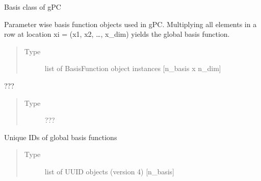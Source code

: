 \documentclass[letterpaper,10pt,english,openany,oneside]{sphinxmanual}
\begin{document}
\begin{fulllineitems}
\label{\detokenize{pygpc:pygpc.Basis.Basis}}
Basis class of gPC

\begin{fulllineitems}
\label{\detokenize{pygpc:pygpc.Basis.Basis.b}}
Parameter wise basis function objects used in gPC.
Multiplying all elements in a row at location xi = (x1, x2, …, x\_dim) yields the global basis function.
\begin{quote}\begin{description}
\item[{Type}] \leavevmode
list of BasisFunction object instances {[}n\_basis x n\_dim{]}

\end{description}\end{quote}

\end{fulllineitems}


\begin{fulllineitems}
\label{\detokenize{pygpc:pygpc.Basis.Basis.b_gpu}}
???
\begin{quote}\begin{description}
\item[{Type}] \leavevmode
???

\end{description}\end{quote}

\end{fulllineitems}


\begin{fulllineitems}
\label{\detokenize{pygpc:pygpc.Basis.Basis.b_id}}
Unique IDs of global basis functions
\begin{quote}\begin{description}
\item[{Type}] \leavevmode
list of UUID objects (version 4) {[}n\_basis{]}

\end{description}\end{quote}


\end{fulllineitems}
\end{fulllineitems}
\end{document}
